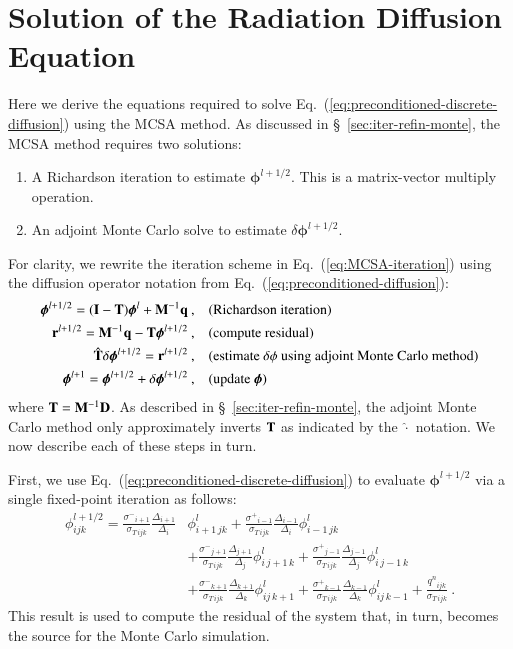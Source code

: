\documentclass[preprint,12pt]{elsarticle}
\newcommand{\vr}{\ensuremath{\ve{r}}}
\newcommand{\vI}{\ensuremath{\ve{I}}}
\newcommand{\qn}{\ensuremath{q^n}} \newcommand{\Tn}{\ensuremath{T^n}}
\newcommand{\Di}{\ensuremath{\Delta_i}}
\newcommand{\Dj}{\ensuremath{\Delta_j}}
\newcommand{\Dk}{\ensuremath{\Delta_k}}
\newcommand{\sigT}{\ensuremath{\sigma_{T\,ijk}}}
\newcommand{\sigm}{\ensuremath{\sigma^{-}}}
\newcommand{\sigp}{\ensuremath{\sigma^{+}}}
\newcommand{\bphi}{\ensuremath{\boldsymbol{\phi}}}
\begin{document}
\section{Solution of the Radiation Diffusion Equation}
\label{sec:solut-radi-diff}

Here we derive the equations required to solve
Eq.~(\ref{eq:preconditioned-discrete-diffusion}) using the MCSA method.  As
discussed in \S~\ref{sec:iter-refin-monte}, the MCSA method requires two
solutions:
\begin{enumerate}
\item A Richardson iteration to estimate $\bphi^{l+1/2}$.  This is a
  matrix-vector multiply operation.
\item An adjoint Monte Carlo solve to estimate $\delta\bphi^{l+1/2}$.
\end{enumerate}
For clarity, we rewrite the iteration scheme in Eq.~(\ref{eq:MCSA-iteration})
using the diffusion operator notation from
Eq.~(\ref{eq:preconditioned-diffusion}):
\begin{align*}
   \bphi^{l+1/2} = (\vI - \ve{T})\bphi^{l} +
  \ve{M}^{-1}\ve{q}\:, \quad & (\text{Richardson iteration})\\
  \vr^{l+1/2} = \ve{M}^{-1}\ve{q} - \ve{\ve{T}}\bphi^{l+1/2}\:,
  \quad & (\text{compute residual})\\
  \hat{\ve{T}}\delta\bphi^{l+1/2} = \vr^{l+1/2}\:, \quad&
  (\text{estimate $\delta\phi$ using adjoint Monte Carlo method})\\
  \bphi^{l+1} = \bphi^{l+1/2} + \delta\bphi^{l+1/2}\:, \quad&
  (\text{update}\ \bphi)
\end{align*}
where $\mathbf{T} = \mathbf{M}^{-1}\mathbf{D}$.  As described in
\S~\ref{sec:iter-refin-monte}, the adjoint Monte Carlo method only
approximately inverts $\mathbf{T}$ as indicated by the $\hat{\cdot}$ notation.
We now describe each of these steps in turn.

First, we use Eq.~(\ref{eq:preconditioned-discrete-diffusion}) to evaluate
$\bphi^{l+1/2}$ via a single fixed-point iteration as follows:
\begin{equation}
  \begin{aligned}
    \phi_{ijk}^{l+1/2} =
    \frac{\sigm_{i+1}}{\sigT}\frac{\Delta_{i+1}}{\Di}&\phi_{i+1\,jk}^l
    +
    \frac{\sigp_{i-1}}{\sigT}\frac{\Delta_{i-1}}{\Di}\phi_{i-1\,jk}^l
    \\ &+
    \frac{\sigm_{j+1}}{\sigT}\frac{\Delta_{j+1}}{\Dj}\phi_{i\,j+1\,k}^l
    +
    \frac{\sigp_{j-1}}{\sigT}\frac{\Delta_{j-1}}{\Dj}\phi_{i\,j-1\,k}^l
    \\ &+
    \frac{\sigm_{k+1}}{\sigT}\frac{\Delta_{k+1}}{\Dk}\phi_{ij\,k+1}^l
    +
    \frac{\sigp_{k-1}}{\sigT}\frac{\Delta_{k-1}}{\Dk}\phi_{ij\,k-1}^l
    + \frac{\qn_{ijk}}{\sigT}\:.
  \end{aligned}
\end{equation}
This result is used to compute the residual of the system that, in turn,
becomes the source for the Monte Carlo simulation.
\end{document}
